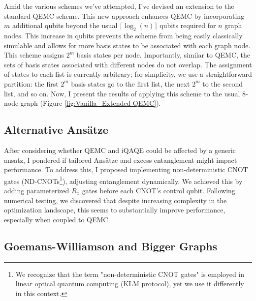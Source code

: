 Amid the various schemes we've attempted, I've devised an extension to the standard QEMC scheme. This new approach enhances QEMC by incorporating $m$ additional qubits beyond the usual $\lceil\log_2(n)\rceil$ qubits required for $n$ graph nodes. This increase in qubits prevents the scheme from being easily classically simulable and allows for more basis states to be associated with each graph node. This scheme assigns $2^m$ basis states per node. Importantly, similar to QEMC, the sets of basis states associated with different nodes do not overlap. The assignment of states to each list is currently arbitrary; for simplicity, we use a straightforward partition: the first $2^m$ basis states go to the first list, the next $2^m$ to the second list, and so on. Now, I present the results of applying this scheme to the usual $8$-node graph (Figure \ref{fig:Vanilla_Extended-QEMC}).

\subsection{Alternative Ansätze}
\label{subsection:Alternative_Ansätze}
After considering whether QEMC and iQAQE could be affected by a generic ansatz, I pondered if tailored Ansätze and excess entanglement might impact performance. To address this, I proposed implementing non-deterministic CNOT gates (ND-CNOTs\footnote{We recognize that the term "non-deterministic CNOT gates" is employed in linear optical quantum computing (KLM protocol), yet we use it differently in this context.}), adjusting entanglement dynamically. We achieved this by adding parameterized $R_x$ gates before each CNOT's control qubit. Following numerical testing, we discovered that despite increasing complexity in the optimization landscape, this seems to substantially improve performance, especially when coupled to QEMC.

\subsection{Goemans-Williamson and Bigger Graphs}
\label{subsection:GW_Bigger_Graphs}


